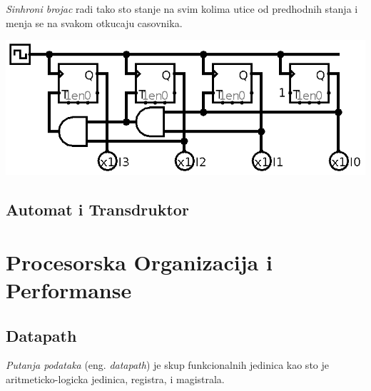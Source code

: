 \documentclass[12p,a4paper]{article}
\begin{document}
\begin{multicols}{2}
    \emph{Sinhroni brojac} radi tako sto stanje na svim kolima utice od 
    predhodnih stanja i menja se na svakom otkucaju casovnika.

    \includegraphics[width=0.9\columnwidth]{Figures/sinhroni.png}

    \subsection{Automat i Transdruktor}

    \section{Procesorska Organizacija i Performanse}

    \subsection{Datapath}
        
    \emph{Putanja podataka} (eng. \emph{datapath}) je skup funkcionalnih 
    jedinica kao sto je aritmeticko-logicka jedinica, registra, i magistrala.


\end{multicols}
\end{document}
